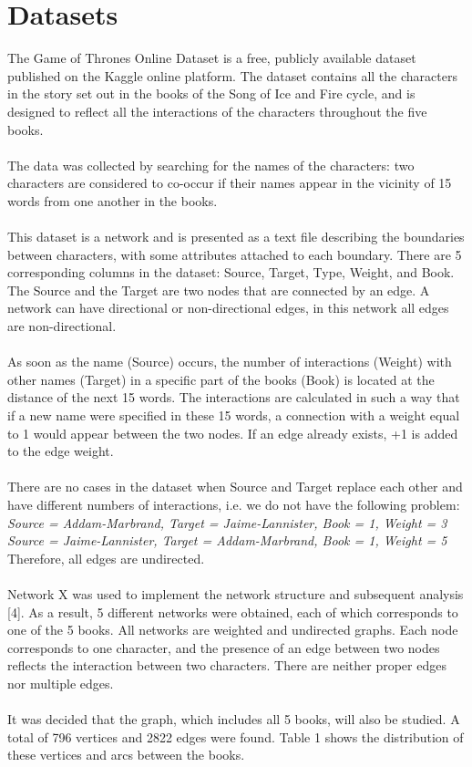\documentclass[12pt, a4paper]{article}
\begin{document}
\section{Datasets}
\label{datasets}
The Game of Thrones Online Dataset is a free, publicly available dataset published on the Kaggle online platform. The dataset contains all the characters in the story set out in the books of the Song of Ice and Fire cycle, and is designed to reflect all the interactions of the characters throughout the five books.
\\\\The data was collected by searching for the names of the characters: two characters are considered to co-occur if their names appear in the vicinity of 15 words from one another in the books.
\\\\This dataset is a network and is presented as a text file describing the boundaries between characters, with some attributes attached to each boundary. There are 5 corresponding columns in the dataset: Source, Target, Type, Weight, and Book. The Source and the Target are two nodes that are connected by an edge. A network can have directional or non-directional edges, in this network all edges are non-directional.
\\\\As soon as the name (Source) occurs, the number of interactions (Weight) with other names (Target) in a specific part of the books (Book) is located at the distance of the next 15 words. The interactions are calculated in such a way that if a new name were specified in these 15 words, a connection with a weight equal to 1 would appear between the two nodes. If an edge already exists, +1 is added to the edge weight.
\\\\There are no cases in the dataset when Source and Target replace each other and have different numbers of interactions, i.e. we do not have the following problem:
\\\textit{Source = Addam-Marbrand, Target = Jaime-Lannister, Book = 1, Weight = 3}
\\\textit{Source = Jaime-Lannister, Target = Addam-Marbrand, Book = 1, Weight = 5}
\\Therefore, all edges are undirected.
\\\\Network X was used to implement the network structure and subsequent analysis [4]. As a result, 5 different networks were obtained, each of which corresponds to one of the 5 books. All networks are weighted and undirected graphs. Each node corresponds to one character, and the presence of an edge between two nodes reflects the interaction between two characters. There are neither proper edges nor multiple edges.
\\\\It was decided that the graph, which includes all 5 books, will also be studied. A total of 796 vertices and 2822 edges were found. Table 1 shows the distribution of these vertices and arcs between the books.
\end{document}
